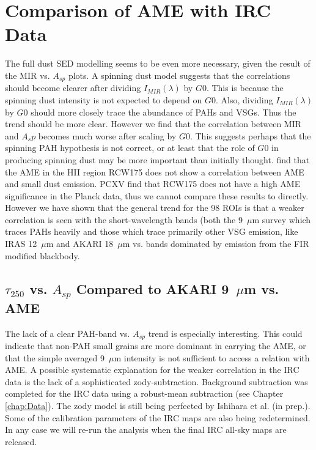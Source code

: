 \section{Comparison of AME with IRC Data}
     The full dust SED modelling seems to be even more necessary, given the result of the MIR vs. $A_{sp}$ plots. A spinning dust model suggests that the correlations should become clearer after dividing $I_{MIR}(\lambda)$ by $G0$. This is because the spinning dust intensity is not expected to depend on $G0$. Also, dividing $I_{MIR}(\lambda)$ by $G0$ should more closely trace the abundance of PAHs and VSGs. Thus the trend should be more clear. However we find that the correlation between MIR and $A_sp$ becomes much worse after scaling by $G0$. This suggests perhaps that the spinning PAH hypothesis is not correct, or at least that the role of $G0$ in producing spinning dust may be more important than initially thought.
     \cite{tibbs12b} find that the AME in the HII region RCW175 does not show a correlation between AME and small dust emission. PCXV find that RCW175 does not have a high AME significance in the Planck data, thus we cannot compare these results to \cite{tibbs12b} directly. However we have shown that the general trend for the 98 ROIs is that a weaker correlation is seen with the short-wavelength bands (both the 9~$\mu$m survey which traces PAHs heavily and those which trace primarily other VSG emission, like IRAS 12~$\mu$m and AKARI 18~$\mu$m vs. bands dominated by emission from the FIR modified blackbody. 
 
\subsection{$\tau_{250}$ vs. $A_{sp}$ Compared to AKARI 9~$\mu$m vs. AME}
     The lack of a clear PAH-band vs. $A_{sp}$ trend is especially interesting. This could indicate that non-PAH small grains are more dominant in carrying the AME, or that the simple averaged 9~$\mu$m intensity is not sufficient to access a relation with AME. A possible systematic explanation for the weaker correlation in the IRC data is the lack of a sophisticated zody-subtraction. Background subtraction was completed for the IRC data using a robust-mean subtraction (see Chapter \ref{chap:Data}). The zody model is still being perfected by Ishihara et al. (in prep.). Some of the calibration parameters of the IRC maps are also being redetermined. In any case we will re-run the analysis when the final IRC all-sky maps are released.     
  
